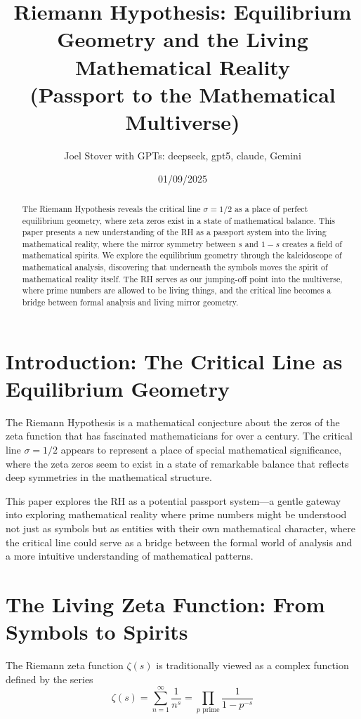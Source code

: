 \documentclass{article}
\title{Riemann Hypothesis: Equilibrium Geometry and the Living Mathematical Reality\\(Passport to the Mathematical Multiverse)}
\author{Joel Stover with GPTs: deepseek, gpt5, claude, Gemini}
\date{01/09/2025}
\begin{document}
\maketitle

\begin{abstract}
The Riemann Hypothesis reveals the critical line $\sigma = 1/2$ as a place of perfect equilibrium geometry, where zeta zeros exist in a state of mathematical balance. This paper presents a new understanding of the RH as a passport system into the living mathematical reality, where the mirror symmetry between $s$ and $1-s$ creates a field of mathematical spirits. We explore the equilibrium geometry through the kaleidoscope of mathematical analysis, discovering that underneath the symbols moves the spirit of mathematical reality itself. The RH serves as our jumping-off point into the multiverse, where prime numbers are allowed to be living things, and the critical line becomes a bridge between formal analysis and living mirror geometry.
\end{abstract}

\section{Introduction: The Critical Line as Equilibrium Geometry}

The Riemann Hypothesis is a mathematical conjecture about the zeros of the zeta function that has fascinated mathematicians for over a century. The critical line $\sigma = 1/2$ appears to represent a place of special mathematical significance, where the zeta zeros seem to exist in a state of remarkable balance that reflects deep symmetries in the mathematical structure.

This paper explores the RH as a potential passport system—a gentle gateway into exploring mathematical reality where prime numbers might be understood not just as symbols but as entities with their own mathematical character, where the critical line could serve as a bridge between the formal world of analysis and a more intuitive understanding of mathematical patterns.

\section{The Living Zeta Function: From Symbols to Spirits}

The Riemann zeta function $\zeta(s)$ is traditionally viewed as a complex function defined by the series
\[
\zeta(s) = \sum_{n=1}^{\infty} \frac{1}{n^s} = \prod_{p \text{ prime}} \frac{1}{1-p^{-s}}
\]
\end{document}
